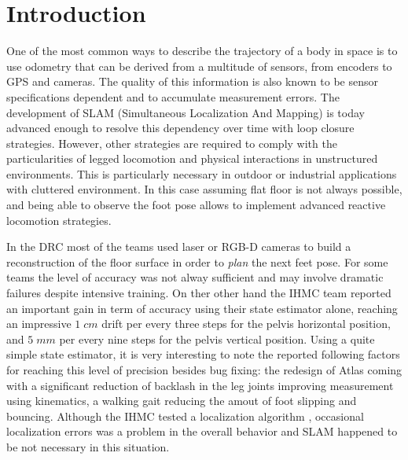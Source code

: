 
\section{Introduction}\label{sec:intro}

One of the most common ways to describe the trajectory of a body in space is to use odometry that can be derived from a multitude of sensors, from encoders to GPS and cameras.
The quality of this information is also known to be sensor specifications dependent and to accumulate measurement errors. The development of SLAM (Simultaneous Localization And Mapping) is today advanced enough to resolve 
this dependency over time with loop closure strategies. However, other strategies are required to comply with the particularities of legged locomotion and physical interactions in unstructured environments. 
This is particularly necessary in outdoor or industrial applications with cluttered environment. 
In this case assuming flat floor is not always possible, and being able to observe the foot pose allows to implement advanced
reactive locomotion strategies.

In the DRC \cite{Johnson:jof:2016,Marion:jof:2017,Karumanchi:jof:2017} most of the teams used laser or RGB-D cameras to build a reconstruction of the floor surface in order to \emph{plan}
the next feet pose. For some teams the level of accuracy was not alway sufficient and may involve dramatic failures \cite{Kaneko:ichr:2015}
despite intensive training.
On ther other hand the IHMC team \cite{Johnson:jof:2016} reported an important gain in term of accuracy using their state estimator alone,
reaching an impressive $1\; cm$ drift per every three steps for the pelvis horizontal position,
and $5\; mm$ per every nine steps for the pelvis vertical position. Using a quite simple state estimator,
it is very interesting to note the reported following factors for reaching this level of precision besides bug fixing:
the redesign of Atlas coming with a significant reduction of backlash in the leg joints improving measurement
using kinematics, a walking gait reducing the amout of foot slipping and bouncing.
Although the IHMC tested a localization algorithm \cite{Pomerlau:ar:2013}, occasional localization errors was
a problem in the overall behavior and SLAM happened to be not necessary in this situation.

